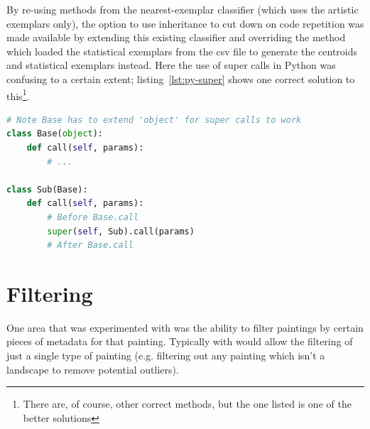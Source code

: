 

By re-using methods from the nearest-exemplar classifier (which uses the artistic exemplars only), 
the option to use inheritance to cut down on code repetition was made available by extending this
existing classifier and overriding the method which loaded the statistical exemplars from the 
\gls{csv} file to generate the centroids and statistical exemplars instead. Here the use of super 
calls in Python was confusing to a certain extent; listing~\ref{lst:py-super} shows one correct 
solution to this\footnote{There are, of course, other correct methods, but the one listed is one 
of the better solutions}.

\begin{lstlisting}[language=python, breaklines=true, label=lst:py-super, 
caption={Super method calls in Python}, frame=single]
# Note Base has to extend 'object' for super calls to work
class Base(object):
    def call(self, params):
        # ...

class Sub(Base):
    def call(self, params):
        # Before Base.call
        super(self, Sub).call(params)
        # After Base.call
\end{lstlisting}


\section{Filtering}
One area that was experimented with was the ability to filter paintings by certain pieces of 
metadata for that painting. Typically with would allow the filtering of just a single type of
painting (e.g. filtering out any painting which isn't a landscape to remove potential outliers).

